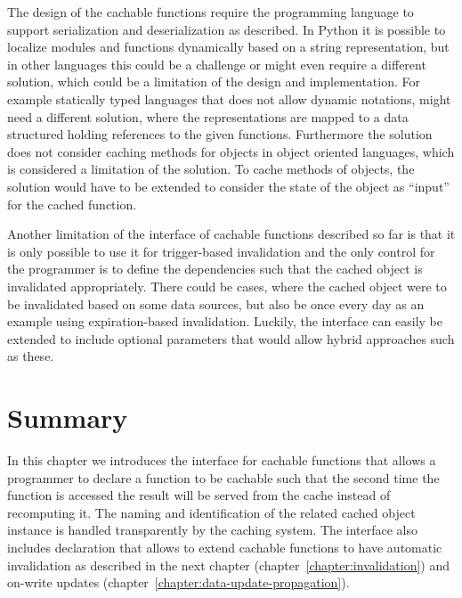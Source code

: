 The design of the cachable functions require the programming language to support serialization and deserialization as described. In Python it is possible to localize modules and functions dynamically based on a string representation, but in other languages this could be a challenge or might even require a different solution, which could be a limitation of the design and implementation. For example statically typed languages that does not allow dynamic notations, might need a different solution, where the representations are mapped to a data structured holding references to the given functions. Furthermore the solution does not consider caching methods for objects in object oriented languages, which is considered a limitation of the solution. To cache methods of objects, the solution would have to be extended to consider the state of the object as ``input'' for the cached function.

Another limitation of the interface of cachable functions described so far is that it is only possible to use it for trigger-based invalidation and the only control for the programmer is to define the dependencies such that the cached object is invalidated appropriately. There could be cases, where the cached object were to be invalidated based on some data sources, but also be once every day as an example using expiration-based invalidation. Luckily, the interface can easily be extended to include optional parameters that would allow hybrid approaches such as these.


\section{Summary}
\label{sec:cachable-functions-summary}

In this chapter we introduces the interface for cachable functions that allows a programmer to declare a function to be cachable such that the second time the function is accessed the result will be served from the cache instead of recomputing it. The naming and identification of the related cached object instance is handled transparently by the caching system. The interface also includes declaration that allows to extend cachable functions to have automatic invalidation as described in the next chapter (chapter~\ref{chapter:invalidation}) and on-write updates (chapter~\ref{chapter:data-update-propagation}).


